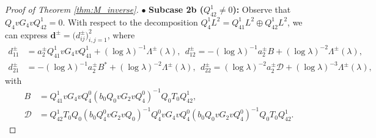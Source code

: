 \documentclass[reqno]{amsart}
\numberwithin{equation}{section}
\begin{document}
\begin{proof}[Proof of Theorem \ref{thm:M_inverse}]
		$\bullet$ \textbf{Subcase 2b ($Q_{42}^1 \neq 0$):} Observe that $Q_4 v G_4 v Q_{42}^1 = 0$. With respect to the decomposition $Q_4^1 L^2 = Q_{41}^1 L^2 \oplus Q_{42}^1 L^2$, we can express $\boldsymbol{d}^\pm=\bigl(d^\pm_{ij}\bigr)_{i,j=1}^2$, where  
		\begin{equation}\label{eq:d_ij}  
			\begin{split}  
				d_{11}^\pm &= a_2^\pm Q_{41}^1 v G_4 v Q_{41}^1 + (\log \lambda)^{-1}\Lambda^\pm(\lambda), \ \  
				d_{12}^\pm = -(\log \lambda)^{-1} a_2^\pm B + (\log \lambda)^{-2}\Lambda^\pm(\lambda), \\  
				d_{21}^\pm &= -(\log \lambda)^{-1} a_2^\pm B^* + (\log \lambda)^{-2}\Lambda^\pm(\lambda), \ \  
				d_{22}^\pm = (\log \lambda)^{-2} a_2^\pm \mathcal{D} + (\log \lambda)^{-3}\Lambda^\pm(\lambda),  
			\end{split}  
		\end{equation}  
		with  
		\[  
		\begin{aligned}    
			B &= Q_{41}^1 v G_4 v Q_4^0 (b_0 Q_0 v G_2 v Q_4^0)^{-1} Q_0 T_0 Q_{42}^1, \\  
			\mathcal{D} &= Q_{42}^1 T_0 Q_0 (b_0 Q_4^0 v G_2 v Q_0)^{-1} Q_4^0 v G_4 v Q_4^0 (b_0 Q_0 v G_2 v Q_4^0)^{-1} Q_0 T_0 Q_{42}^1.  
		\end{aligned}  
		\] 
        

\end{proof}
\end{document}

